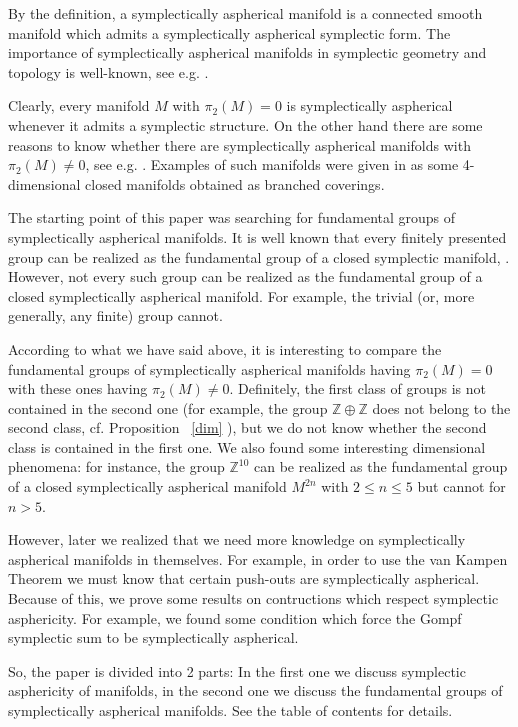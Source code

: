 \documentclass[12pt, twoside]{amsart}
\theoremstyle{plain}
\theoremstyle{definition}
\numberwithin{equation}{section}
\def\ZZ{\mathbb Z}
\def\ZZ{\mathbb Z}
\def\m{\medskip}
\begin{document}
\m By the definition, a symplectically aspherical manifold is a connected 
smooth 
manifold which admits a  symplectically aspherical symplectic form. The 
importance of symplectically aspherical  manifolds in symplectic geometry and 
topology is well-known, see e.g. \cite{F, H, LO, R2,
RO, RT}. 
 
\m Clearly, every manifold $M$ with $\pi_2(M)=0$ is symplectically
aspherical whenever it admits a symplectic structure. On the other hand there 
are some reasons to know whether there are symplectically aspherical manifolds 
with $\pi_2(M)\ne 0$, see e.g. \cite{G2}. Examples of such manifolds were 
given 
in \cite{G2} as some 4-dimensional closed manifolds obtained as branched 
coverings.

\m The starting point of this paper was searching for fundamental groups of
symplectically aspherical manifolds. It is well known that every finitely 
presented group can be realized as the fundamental group of a closed 
symplectic 
manifold, \cite{G1}. However, not every such group can be realized as the 
fundamental group of a closed symplectically aspherical manifold. For example, 
the trivial (or, more generally, any finite) group cannot. 

\m
 According to what we have said above, it is interesting to compare the 
fundamental groups of symplectically aspherical manifolds having $\pi_2(M)=0$ 
with these ones having $\pi_2(M)\ne 0$. Definitely, the first class of groups 
is not contained in the second one (for example, the group $\ZZ\oplus \ZZ$ does 
not belong to the second class, cf. Proposition ~\ref{dim} ), but we do not know 
whether the second class is contained in the first one. We also found some 
interesting dimensional phenomena: for instance, the group $\ZZ^{10}$ can be 
realized as the fundamental group of a closed symplectically aspherical 
manifold 
$M^{2n}$ with $2\le n \le 5$ but cannot for $n>5$.

\m However, later we realized that we need more knowledge on symplectically 
aspherical manifolds in themselves. For example, in order to use the van 
Kampen 
Theorem we must know that certain push-outs are symplectically aspherical. 
Because of this, we prove some results on contructions which respect 
symplectic 
asphericity. For example, we found some condition which force the Gompf 
symplectic sum to be symplectically aspherical.

\m So, the paper is divided into 2 parts: In the first one we discuss symplectic 
asphericity of manifolds, in the second one we discuss the fundamental groups 
of symplectically aspherical manifolds. See the table of contents for details.
\end{document}
